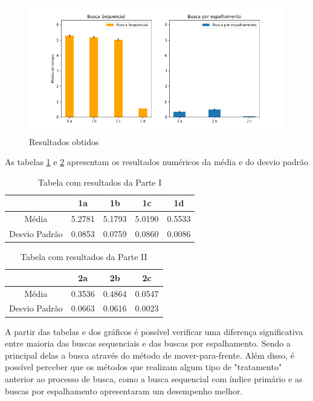 \documentclass{article}
\begin{document}

\begin{figure}[!htb]
    \centering
    \includegraphics[width=13cm]{grafico.png}
    \caption{Resultados obtidos}
    \label{fig:graficoresultados}
\end{figure}

As tabelas \ref{tab:resultados} e  \ref{tab:resultados2} apresentam os resultados numéricos da média e do desvio padrão

\begin{table}[!htb]
    \centering
    \begin{tabular}{|c|c|c|c|c|}
    \hline
         & 1a & 1b & 1c & 1d   \\ \hline
      Média & 5.2781 & 5.1793 &  5.0190& 0.5533  \\\hline
      Desvio Padrão & 0.0853 & 0.0759 &  0.0860 & 0.0086 \\\hline
    \end{tabular}
    \caption{Tabela com resultados da Parte I}
    \label{tab:resultados}
\end{table}

\begin{table}[!htb]
    \centering
    \begin{tabular}{|c|c|c|c|}
    \hline
         & 2a   & 2b & 2c   \\ \hline
      Média & 0.3536 & 0.4864 &  0.0547 \\\hline
      Desvio Padrão & 0.0663 &  0.0616 &  0.0023\\ \hline
    \end{tabular}
    \caption{Tabela com resultados da Parte II}
    \label{tab:resultados2}
\end{table}

A partir das tabelas e dos gráficos é possível verificar uma diferença significativa entre maioria das buscas sequenciais e das buscas por espalhamento. Sendo a principal delas a busca através do método de mover-para-frente.
Além disso, é possível perceber que os métodos que realizam algum tipo de "tratamento" anterior ao processo de busca, como a busca sequencial com índice primário e as buscas por espalhamento apresentaram um desempenho melhor.
\end{document}
